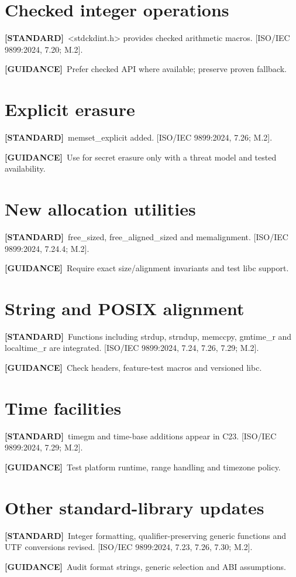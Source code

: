 \documentclass[10pt,letterpaper,oneside]{report}
\newcommand{\refcl}[1]{\textsf{\footnotesize[ISO/IEC 9899:2024, #1]}}
\newcommand{\standard}{\textbf{[STANDARD]}}
\newcommand{\guidance}{\textbf{[GUIDANCE]}}
\begin{document}
\section{Checked integer operations}
\standard\ <stdckdint.h> provides checked arithmetic macros. \refcl{7.20; M.2}.\par\guidance\ Prefer checked API where available; preserve proven fallback.

\section{Explicit erasure}
\standard\ memset\_explicit added. \refcl{7.26; M.2}.\par\guidance\ Use for secret erasure only with a threat model and tested availability.

\section{New allocation utilities}
\standard\ free\_sized, free\_aligned\_sized and memalignment. \refcl{7.24.4; M.2}.\par\guidance\ Require exact size/alignment invariants and test libc support.

\section{String and POSIX alignment}
\standard\ Functions including strdup, strndup, memccpy, gmtime\_r and localtime\_r are integrated. \refcl{7.24, 7.26, 7.29; M.2}.\par\guidance\ Check headers, feature-test macros and versioned libc.

\section{Time facilities}
\standard\ timegm and time-base additions appear in C23. \refcl{7.29; M.2}.\par\guidance\ Test platform runtime, range handling and timezone policy.

\section{Other standard-library updates}
\standard\ Integer formatting, qualifier-preserving generic functions and UTF conversions revised. \refcl{7.23, 7.26, 7.30; M.2}.\par\guidance\ Audit format strings, generic selection and ABI assumptions.
\end{document}
